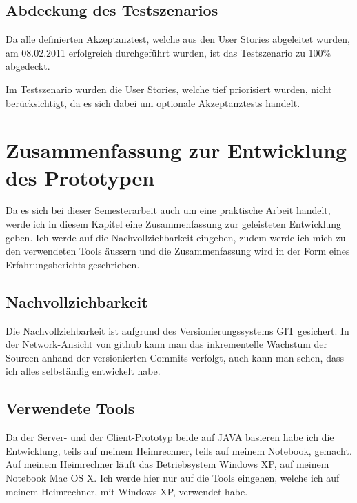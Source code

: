 \documentclass[abstracton, listof=totocnumbered,
bibliography=totocnumbered]{scrreprt}
\begin{document}
  \clearpage
  
  \section{Abdeckung des Testszenarios}
  
  Da alle definierten Akzeptanztest, welche aus den User Stories abgeleitet
  wurden, am 08.02.2011 erfolgreich durchgeführt wurden, ist das Testszenario zu
  100\% abgedeckt.
  
  Im Testszenario wurden die User Stories, welche tief priorisiert wurden, nicht
  berücksichtigt, da es sich dabei um optionale Akzeptanztests handelt.
  
  \newpage
  
  \chapter{Zusammenfassung zur Entwicklung des Prototypen}
  
  Da es sich bei dieser Semesterarbeit auch um eine praktische Arbeit handelt,
  werde ich in diesem Kapitel eine Zusammenfassung zur geleisteten Entwicklung
  geben. Ich werde auf die Nachvollziehbarkeit eingeben, zudem werde ich mich
  zu den verwendeten Tools äussern und die Zusammenfassung wird in der Form
  eines Erfahrungsberichts geschrieben.
  
  \section{Nachvollziehbarkeit}
  
  Die Nachvollziehbarkeit ist aufgrund des Versionierungssystems GIT\cite{GIT}
  gesichert. In der Network-Ansicht von github kann man das inkrementelle
  Wachstum der Sourcen anhand der versionierten Commits verfolgt, auch
  kann man sehen, dass ich alles selbständig entwickelt habe.
  
  \section{Verwendete Tools}
  
  Da der Server- und der Client-Prototyp beide auf JAVA basieren habe ich die
  Entwicklung, teils auf meinem Heimrechner, teils auf meinem Notebook, gemacht.
  Auf meinem Heimrechner läuft das Betriebsystem Windows XP, auf meinem Notebook
  Mac OS X. Ich werde hier nur auf die Tools eingehen, welche ich auf meinem
  Heimrechner, mit Windows XP, verwendet habe.
  
\end{document}
